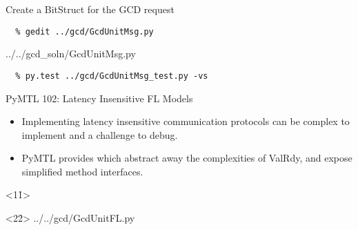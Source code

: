 \begin{task}\begin{frame}[fragile]{Create a BitStruct for the GCD request}

\vspace{-0.15in}
\begin{Verbatim}[commandchars=\\\{\}]
  % cd \midtilde/pymtl-tut/build
  % gedit ../gcd/GcdUnitMsg.py
\end{Verbatim}
\vspace{-0.2in}

%
{../../gcd_soln/GcdUnitMsg.py}

\vspace{-0.22in}
\begin{verbatim}
  % py.test ../gcd/GcdUnitMsg_test.py -vs
\end{verbatim}
\end{frame}
\end{task}

\begin{frame}{PyMTL 102: Latency Insensitive FL Models}
\begin{itemize}
  \item Implementing latency insensitive communication protocols can be
        complex to implement and a challenge to debug.
  \smallskip
  \item PyMTL provides  which abstract away the
        complexities of ValRdy, and expose simplified method interfaces.
\end{itemize}

  \begin{onlyenv}<1\h1>
  \end{onlyenv}

  \begin{onlyenv}<2\h2>
  \vspace{-0.15in}
  {../../gcd/GcdUnitFL.py}
  \end{onlyenv}

\end{frame}

